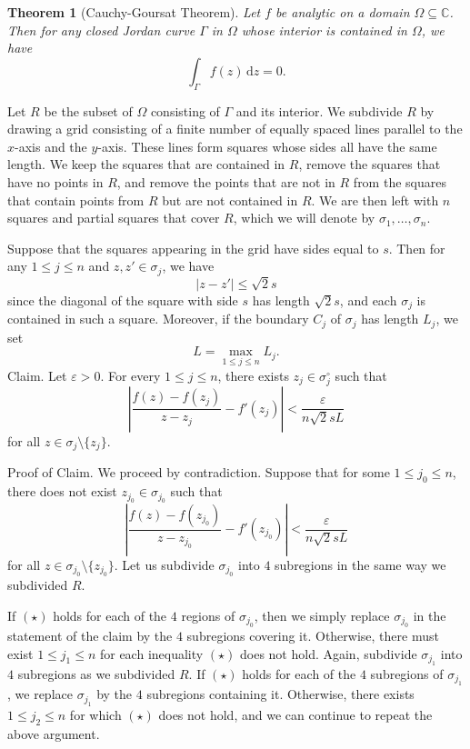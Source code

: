 \documentclass[10pt]{article}
\makeatletter
\newcommand{\eps}{\varepsilon}
\newcommand{\C}{\mathbb{C}}
\newcommand{\dd}{\,\mathrm{d}}
\theoremstyle{newstyle}
\newtheorem{thm}{Theorem}[section]
\newenvironment{pf}[1][\proofname]{\par
  \pushQED{\qed}%
  \normalfont \topsep0\p@\relax
  \trivlist
  \item[\hskip\labelsep\scshape
  #1\@addpunct{.}]\ignorespaces
}{%
  \popQED\endtrivlist\@endpefalse
}
\makeatother
\begin{document}
\begin{thm}[Cauchy-Goursat Theorem]
Let $f$ be analytic on a domain $\Omega \subseteq \C$. Then for any closed Jordan curve 
$\Gamma$ in $\Omega$ whose interior is contained in $\Omega$, we have 
\[ \int_\Gamma f(z)\dd z = 0. \]
\end{thm}
\begin{pf}
Let $R$ be the subset of $\Omega$ consisting of $\Gamma$ and its interior. 
We subdivide $R$ by drawing a grid consisting of a finite number of equally spaced lines 
parallel to the $x$-axis and the $y$-axis. These lines form squares whose sides 
all have the same length. We keep the squares that are contained in $R$, remove the 
squares that have no points in $R$, and remove the points that are not in $R$ from the 
squares that contain points from $R$ but are not contained in $R$. We are then left 
with $n$ squares and partial squares that cover $R$, which we will denote by 
$\sigma_1, \dots, \sigma_n$. 

Suppose that the squares appearing in the grid have sides equal to $s$. Then for any 
$1 \leq j \leq n$ and $z, z' \in \sigma_j$, we have 
\[ |z - z'| \leq \sqrt2 s \]
since the diagonal of the square with side $s$ has length $\sqrt2 s$, and each 
$\sigma_j$ is contained in such a square. Moreover, if the boundary $C_j$ of $\sigma_j$ 
has length $L_j$, we set 
\[ L = \max_{1\leq j \leq n} L_j. \]
{\sc Claim.} Let $\eps > 0$. For every $1 \leq j \leq n$, there exists $z_j \in \sigma_j^\circ$ 
such that 
\[ \left| \frac{f(z)- f(z_j)}{z - z_j} - f'(z_j) \right| < \frac{\eps}{n\sqrt2 s L} \tag{$\star$} \]
for all $z \in \sigma_j \setminus \{z_j\}$. 

{\sc Proof of Claim.} We proceed by contradiction. Suppose that for some $1 \leq j_0 \leq n$, there 
does not exist $z_{j_0} \in \sigma_{j_0}$ such that 
\[ \left| \frac{f(z) - f(z_{j_0})}{z - z_{j_0}} - f'(z_{j_0}) \right| < \frac{\eps}{n\sqrt2 sL} \]
for all $z \in \sigma_{j_0} \setminus \{z_{j_0}\}$. Let us subdivide $\sigma_{j_0}$ into $4$ 
subregions in the same way we subdivided $R$. 

If $(\star)$ holds for each of the $4$ regions of $\sigma_{j_0}$, then we simply replace 
$\sigma_{j_0}$ in the statement of the claim by the $4$ subregions covering it. 
Otherwise, there must exist $1 \leq j_1 \leq n$ for each inequality $(\star)$ does not hold. 
Again, subdivide $\sigma_{j_1}$ into $4$ subregions as we subdivided $R$. If 
$(\star)$ holds for each of the $4$ subregions of $\sigma_{j_1}$, we replace 
$\sigma_{j_1}$ by the $4$ subregions containing it. Otherwise, there exists 
$1 \leq j_2 \leq n$ for which $(\star)$ does not hold, and we can continue to repeat the above argument. 


\end{pf}
\end{document}
